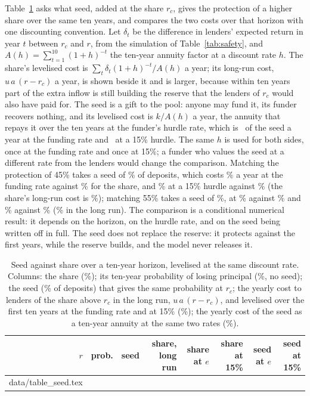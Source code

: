 \documentclass[preprint,11pt,authoryear]{elsarticle}
\makeatletter
\theoremstyle{definition}
\newcommand{\inputrows}[1]{\@@input #1 }
\makeatother
\begin{document}
Table~\ref{tab:seed} asks what seed, added at the share $r_c$, gives the protection of a higher share over the same ten
years, and compares the two costs over that horizon with one discounting convention. Let $\delta_t$ be the difference in
lenders' expected return in year $t$ between $r_c$ and $r$, from the simulation of Table~\ref{tab:safety}, and
$A(h)=\sum_{t=1}^{10}(1+h)^{-t}$ the ten-year annuity factor at a discount rate $h$. The share's levelised cost is
$\sum_t\delta_t(1+h)^{-t}/A(h)$ a year; its long-run cost, $u\,a\,(r-r_c)$ a year, is shown beside it and is larger,
because within ten years part of the extra inflow is still building the reserve that the lenders of $r_c$ would also have
paid for. The seed is a gift to the pool: anyone may fund it, its funder recovers nothing, and its levelised cost is
$k/A(h)$ a year, the annuity that repays it over the ten years at the funder's hurdle rate, which is \AnnuityAtE\ of the
seed a year at the funding rate and \AnnuityAtFifteen\ at a 15\% hurdle. The same $h$ is used for both sides, once at the
funding rate and once at 15\%; a funder who values the seed at a different rate from the lenders would change the
comparison. Matching the protection of 45\% takes a seed of \SeedEquivFortyFive\% of deposits, which costs
\SeedCostEFortyFive\% a year at the funding rate against \ShareCostTenEFortyFive\% for the share, and
\SeedCostFortyFive\% at a 15\% hurdle against \ShareCostTenHFortyFive\% (the share's long-run cost is
\ShareCostFortyFive\%); matching 55\% takes a seed of \SeedEquivFiftyFive\%, at \SeedCostEFiftyFive\% against
\ShareCostTenEFiftyFive\% and \SeedCostFiftyFive\% against \ShareCostTenHFiftyFive\% (\ShareCostFiftyFive\% in the long
run). The comparison is a conditional numerical result: it depends on the horizon, on the hurdle rate, and on the seed
being written off in full. The seed does not replace the reserve: it protects against the first years, while the reserve
builds, and the model never releases it.

\begin{table}[ht]
  \centering\small
  \caption{Seed against share over a ten-year horizon, levelised at the same discount rate. Columns: the share (\%); its
  ten-year probability of losing principal (\%, no seed); the seed (\% of deposits) that gives the same probability at
  $r_c$; the yearly cost to lenders of the share above $r_c$ in the long run, $u\,a\,(r-r_c)$, and levelised over the
  first ten years at the funding rate and at 15\% (\%); the yearly cost of the seed as a ten-year annuity at the same two
  rates (\%).}
  \label{tab:seed}
  \begin{tabular}{rrrrrrrr}
    \toprule
    $r$ & prob. & seed & share, long run & share at $e$ & share at 15\% & seed at $e$ & seed at 15\% \\
    \midrule
    \inputrows{data/table_seed.tex}
    \bottomrule
  \end{tabular}
\end{table}
\end{document}
